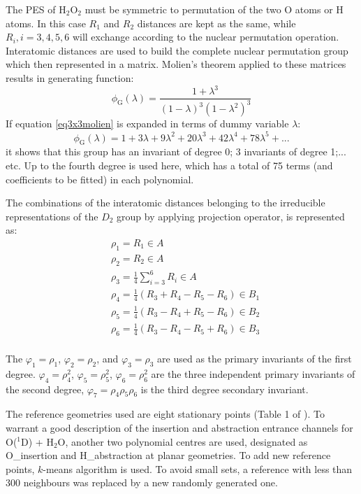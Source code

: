 \documentclass[12pt]{article}
\begin{document}
The PES of H$_2$O$_2$ must be symmetric to permutation of the two O atoms or H atoms. In this case $R_1$ and $R_2$ distances are kept as the same, while $R_i, i=3,4,5,6$ will exchange according to the nuclear permutation operation. Interatomic distances are used to build the complete nuclear permutation group which then represented in a matrix. Molien's theorem applied to these matrices results in generating function:
\begin{equation}
    \phi_\text{G}(\lambda) = \frac{1+\lambda^3}{(1-\lambda)^3(1-\lambda^2)^3}
\label{eq3x3molien}
\end{equation}      
If equation \ref{eq3x3molien} is expanded in terms of dummy variable $\lambda$:
\begin{equation}
    \phi_\text{G}(\lambda) = 1 + 3\lambda + 9\lambda^2 + 20\lambda^3 + 42\lambda^4 + 78\lambda^5 + ...
\label{eq3x3molienexpand}
\end{equation}   
it shows that this group has an invariant of degree 0; 3 invariants of degree 1;... etc. Up to the fourth degree is used here, which has a total of 75 terms (and coefficients to be fitted) in each polynomial.

The combinations of the interatomic distances belonging to the irreducible representations of the $D_2$ group by applying projection operator, is represented as:
\begin{equation}
    \begin{split}
        &\rho_1 = R_1  \in A \\
        &\rho_2 = R_2  \in A \\
        &\rho_3 = \frac{1}{4}\sum^6_{i=3}R_i  \in A \\
        &\rho_4 = \frac{1}{4}(R_3+R_4-R_5-R_6) \in B_1 \\
        &\rho_5 = \frac{1}{4}(R_3-R_4+R_5-R_6) \in B_2 \\
        &\rho_6 = \frac{1}{4}(R_3-R_4-R_5+R_6) \in B_3 \\
    \end{split}
\label{eq3x3project}
\end{equation}

The $\varphi_1 = \rho_1$, $\varphi_2 = \rho_2$, and $\varphi_3 = \rho_3$ are used as the primary invariants of the first degree. $\varphi_4 = \rho_4^2$, $\varphi_5 = \rho_5^2$, $\varphi_6 = \rho_6^2$ are the three independent primary invariants of the second degree, $\varphi_7 = \rho_4\rho_5\rho_6$ is the third degree secondary invariant.

The reference geometries used are eight stationary points (Table 1 of \cite{coelho17}). To warrant a good description of the insertion and abstraction entrance channels for O($^1$D) + H$_2$O, another two polynomial centres are used, designated as O\_insertion and H\_abstraction at planar geometries. To add new reference points, $k$-means algorithm is used. To avoid small sets, a reference with less than 300 neighbours was replaced by a new randomly generated one.
\end{document}
